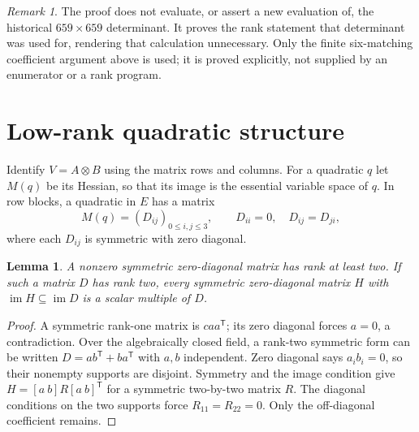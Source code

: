 \documentclass[11pt]{article}
\newtheorem{lemma}[theorem]{Lemma}
\theoremstyle{remark}
\newtheorem{remark}[theorem]{Remark}
\newcommand{\im}{\operatorname{im}}
\begin{document}
\begin{remark}
The proof does not evaluate, or assert a new evaluation of, the historical
$659\times659$ determinant. It proves the rank statement that determinant
was used for, rendering that calculation unnecessary. Only the finite
six-matching coefficient argument above is used; it is proved explicitly,
not supplied by an enumerator or a rank program.
\end{remark}

\section{Low-rank quadratic structure}
Identify $V=A\otimes B$ using the matrix rows and columns. For a quadratic
$q$ let $M(q)$ be its Hessian, so that its image is the essential variable
space of $q$. In row blocks, a quadratic in $E$ has a matrix
\[
 M(q)=(D_{ij})_{0\leq i,j\leq3},\qquad D_{ii}=0,\quad D_{ij}=D_{ji},
\]
where each $D_{ij}$ is symmetric with zero diagonal.

\begin{lemma}\label{lem:zero-diagonal}
A nonzero symmetric zero-diagonal matrix has rank at least two.
If such a matrix $D$ has rank two, every symmetric zero-diagonal matrix
$H$ with $\im H\subseteq\im D$ is a scalar multiple of $D$.
\end{lemma}
\begin{proof}
A symmetric rank-one matrix is $caa^{\mathsf T}$; its zero diagonal forces
$a=0$, a contradiction. Over the algebraically closed field, a rank-two
symmetric form can be written
$D=ab^{\mathsf T}+ba^{\mathsf T}$ with $a,b$ independent.
Zero diagonal says $a_ib_i=0$, so their nonempty supports are disjoint.
Symmetry and the image condition give
$H=[a\ b]R[a\ b]^{\mathsf T}$ for a symmetric two-by-two matrix $R$.
The diagonal conditions on the two supports force $R_{11}=R_{22}=0$.
Only the off-diagonal coefficient remains.
\end{proof}
\end{document}
